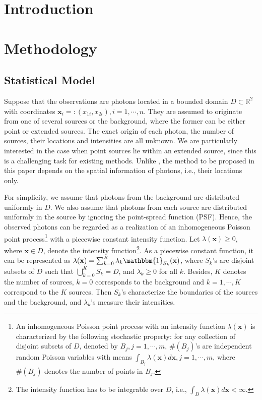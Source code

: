 \documentclass{aastex61}
\begin{document}

\section{Introduction} \label{sec:intro}

\section{Methodology} \label{sec:method}

\subsection{Statistical Model}

Suppose that the observations are photons located in a bounded domain $D \subset \mathbb{R}^2$ with coordinates $\mathbf{x}_i=:(x_{1i}, x_{2i}), i=1, \cdots, n$. They are assumed to originate from one of several sources or the background, where the former can be either point or extended sources. The exact origin of each photon, the number of sources, their locations and
intensities are all unknown. We are particularly interested in the case when point sources lie within an extended source, since this is a challenging task for existing methods.  Unlike \citet{Jones-15}, the method to be proposed in this paper depends on the spatial information of photons, i.e., their locations only.

For simplicity, we assume that photons from the background are distributed uniformly in $D$. We also assume that photons from each source are distributed uniformly in the source by ignoring the point-spread function (PSF). Hence, the observed photons can be regarded as a realization of an inhomogeneous Poisson point process\footnote{An inhomogeneous Poisson point process with an intensity function $\lambda(\mathbf{x})$ is characterized by the following stochastic property:
for any collection of disjoint subsets of $D$, denoted by $B_j, j=1,\cdots, m$, $\#(B_j)$'s are independent random Poisson variables with means $\int_{B_j}\lambda(\mathbf{x})d\mathbf{x}, j=1,\cdots, m$,
where $\#(B_j)$ denotes the number of points in $B_j$.} 
with a piecewise constant intensity function. Let $\lambda(\mathbf{x})\geq 0$, where $\mathbf{x}\in D$, denote the intensity function\footnote{The intensity function has to be integrable over $D$,
i.e., $\int_D\lambda(\mathbf{x})d\mathbf{x}<\infty$.}. 
As a piecewise constant function, it can be represented as $\lambda(\mathbf{x})=\sum_{k=0}^K \lambda_k \mathbbm{1}_{S_k}(\mathbf{x})$, where
$S_k$'s are disjoint subsets of $D$ such that $\bigcup_{k=0}^K S_k = D$, and $\lambda_k\geq 0$ for all $k$. Besides, $K$ denotes the number of sources, $k=0$ 
corresponds to the background and $k=1,\cdots, K$ correspond to the $K$ sources. Then $S_k$'s characterize the boundaries of the sources and the background, and $\lambda_k$'s measure their intensities. 
\end{document}
